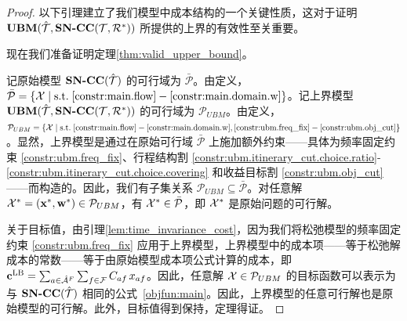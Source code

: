 \begin{proof}
    以下引理建立了我们模型中成本结构的一个关键性质，这对于证明 $\textbf{UBM}(\hat{\mathcal{T}}, \textbf{SN-CC}({\mathcal{T}, \mathcal{R}^{*}}))$ 所提供的上界的有效性至关重要。
    

    现在我们准备证明定理\ref{thm:valid_upper_bound}。

    记原始模型 $\textbf{SN-CC}({\hat{\mathcal{T}}})$ 的可行域为 $\bar{\mathcal{P}}$。由定义，$\bar{\mathcal{P}} = \{\solution \mid \text{s.t.}\;\eqref{constr:main.flow}-\eqref{constr:main.domain.w}\}$。记上界模型 $\textbf{UBM}(\hat{\mathcal{T}}, \textbf{SN-CC}({\mathcal{T}, \mathcal{R}^{*}}))$ 的可行域为 $\mathcal{P}_{UBM}$。由定义，$\mathcal{P}_{UBM} = \{\solution \mid \text{s.t.}\;\eqref{constr:main.flow}-\eqref{constr:main.domain.w}, \eqref{constr:ubm.freq_fix}-\eqref{constr:ubm.obj_cut}\}$。显然，上界模型是通过在原始可行域 $\bar{\mathcal{P}}$ 上施加额外约束——具体为频率固定约束 \eqref{constr:ubm.freq_fix}、行程结构割 \eqref{constr:ubm.itinerary_cut.choice.ratio}-\eqref{constr:ubm.itinerary_cut.choice.covering} 和收益目标割 \eqref{constr:ubm.obj_cut}——而构造的。因此，我们有子集关系 $\mathcal{P}_{UBM} \subseteq \bar{\mathcal{P}}$。对任意解 $\mathcal{X}^* = (\mathbf{x}^*, \mathbf{w}^*) \in \mathcal{P}_{UBM}$，有 $\mathcal{X}^* \in \bar{\mathcal{P}}$，即 $\mathcal{X}^*$ 是原始问题的可行解。
    
    关于目标值，由引理\ref{lem:time_invariance_cost}，因为我们将松弛模型的频率固定约束 \eqref{constr:ubm.freq_fix} 应用于上界模型，上界模型中的成本项——等于松弛解成本的常数——等于由原始模型成本项公式计算的成本，即 $\full{\textbf{c}^{\mathrm{LB}} = \sum_{a\in \flightArc}\sum_{f\in \fleetSet} \cost_{af}\, \fleetAssignVar_{af}}$。因此，任意解 $\mathcal{X} \in \mathcal{P}_{UBM}$ 的目标函数可以表示为与 $\textbf{SN-CC}({\hat{\mathcal{T}}})$ 相同的公式~\eqref{objfun:main}。因此，上界模型的任意可行解也是原始模型的可行解。此外，目标值得到保持，定理得证。
\end{proof}